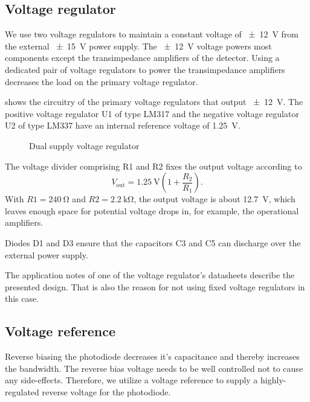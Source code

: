 \subsection{Voltage regulator}

We use two voltage regulators to maintain a constant voltage of \SI{\pm12}{\volt} from the external \SI{\pm15}{\volt} power supply. The \SI{\pm12}{\volt} voltage powers most components except the transimpedance amplifiers of the detector.
Using a dedicated pair of voltage regulators to power the transimpedance amplifiers decreases the load on the primary voltage regulator.

 shows the circuitry of the primary voltage regulators that output \SI{\pm12}{\volt}.
The positive voltage regulator U1 of type LM317 and the negative voltage regulator U2 of type LM337 have an internal reference voltage of \SI{1.25}{\volt}.

\begin{figure}[H]
	\centering
	
	\caption{Dual supply voltage regulator}\label{fig:voltage_regulator}
\end{figure}

The voltage divider comprising R1 and R2 fixes the output voltage according to
\begin{equation}
	V_\text{out}=\SI{1.25}{\volt}\left(1+\frac{R_2}{R_1}\right).
\end{equation}
With $R1 = \SI{240}{\ohm}$ and $R2 = \SI{2.2}{\kilo\ohm}$, the output voltage is about \SI{12.7}{\volt}, which leaves enough space for potential voltage drops in, for example, the operational amplifiers.

Diodes D1 and D3 ensure that the capacitors C3 and C5 can discharge over the external power supply.

The application notes of one of the voltage regulator's datasheets describe the presented design.
That is also the reason for not using fixed voltage regulators in this case.

\subsection{Voltage reference}

Reverse biasing the photodiode decreases it's capacitance and thereby increases the bandwidth.
The reverse bias voltage needs to be well controlled not to cause any side-effects.
Therefore, we utilize a voltage reference to supply a highly-regulated reverse voltage for the photodiode.

